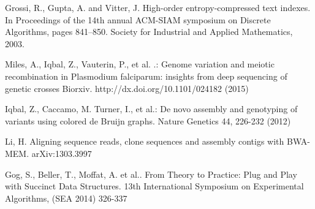 \documentclass[runningheads,a4paper]{llncs}
\begin{document}
\begin{thebibliography}{4}
 Grossi, R., Gupta, A. and Vitter, J. High-order entropy-compressed text indexes. In Proceedings of the 14th annual ACM-SIAM symposium on Discrete Algorithms, pages 841–850. Society for Industrial and Applied Mathematics, 2003.

 Miles, A., Iqbal, Z., Vauterin, P., et al. .: Genome variation and meiotic recombination in Plasmodium falciparum: insights from deep sequencing of genetic crosses Biorxiv. http://dx.doi.org/10.1101/024182 (2015)

 Iqbal, Z., Caccamo, M. Turner, I.,  et al.: De novo assembly and genotyping of variants using colored de Bruijn graphs. Nature Genetics  44, 226-232 (2012)

 Li, H. Aligning sequence reads, clone sequences and assembly contigs with BWA-MEM. 	arXiv:1303.3997

 Gog, S., Beller, T., Moffat, A. et al.. From Theory to Practice: Plug and Play with Succinct Data Structures. 13th International Symposium on Experimental Algorithms, (SEA 2014) 326-337

\end{thebibliography}
\end{document}
